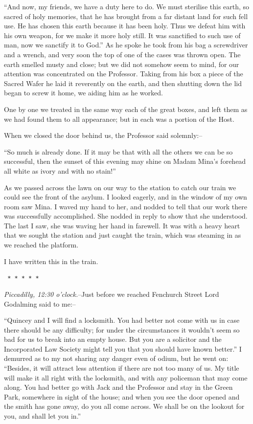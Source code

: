 \documentclass[12pt,openright]{book}
\begin{document}
“And now, my friends, we have a duty here to do. We must sterilise this earth, so sacred of holy memories, that he has brought from a far distant land for such fell use. He has chosen this earth because it has been holy. Thus we defeat him with his own weapon, for we make it more holy still. It was sanctified to such use of man, now we sanctify it to God.” As he spoke he took from his bag a screwdriver and a wrench, and very soon the top of one of the cases was thrown open. The earth smelled musty and close; but we did not somehow seem to mind, for our attention was concentrated on the Professor. Taking from his box a piece of the Sacred Wafer he laid it reverently on the earth, and then shutting down the lid began to screw it home, we aiding him as he worked.

One by one we treated in the same way each of the great boxes, and left them as we had found them to all appearance; but in each was a portion of the Host.

When we closed the door behind us, the Professor said solemnly:–

“So much is already done. If it may be that with all the others we can be so successful, then the sunset of this evening may shine on Madam Mina’s forehead all white as ivory and with no stain!”

As we passed across the lawn on our way to the station to catch our train we could see the front of the asylum. I looked eagerly, and in the window of my own room saw Mina. I waved my hand to her, and nodded to tell that our work there was successfully accomplished. She nodded in reply to show that she understood. The last I saw, she was waving her hand in farewell. It was with a heavy heart that we sought the station and just caught the train, which was steaming in as we reached the platform.

I have written this in the train.

\texttt{   *       *       *       *       *}

\textit{Piccadilly, 12:30 o’clock.}–Just before we reached Fenchurch Street Lord Godalming said to me:–

“Quincey and I will find a locksmith. You had better not come with us in case there should be any difficulty; for under the circumstances it wouldn’t seem so bad for us to break into an empty house. But you are a solicitor and the Incorporated Law Society might tell you that you should have known better.” I demurred as to my not sharing any danger even of odium, but he went on: “Besides, it will attract less attention if there are not too many of us. My title will make it all right with the locksmith, and with any policeman that may come along. You had better go with Jack and the Professor and stay in the Green Park, somewhere in sight of the house; and when you see the door opened and the smith has gone away, do you all come across. We shall be on the lookout for you, and shall let you in.”
\end{document}
